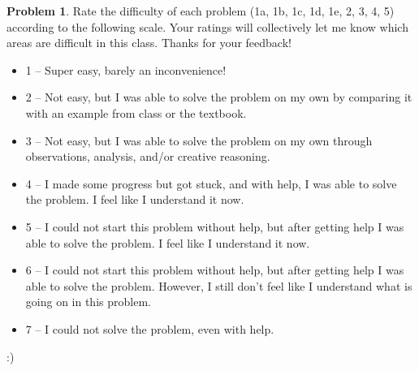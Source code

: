 \documentclass[11pt,oneside]{amsart}
\theoremstyle{definition}
\newtheorem{problem}{Problem}
\theoremstyle{plain}
\begin{document}
    \begin{problem}
        Rate the difficulty of each problem (1a, 1b, 1c, 1d, 1e, 2, 3, 4, 5) according to the following scale. Your ratings will collectively let me know which areas are difficult in this class. Thanks for your feedback!
        \begin{itemize}
            \item 1 -- Super easy, barely an inconvenience!
            \item 2 -- Not easy, but I was able to solve the problem on my own by comparing it with an example from class or the textbook.
            \item 3 -- Not easy, but I was able to solve the problem on my own through observations, analysis, and/or creative reasoning.
            \item 4 -- I made some progress but got stuck, and with help, I was able to solve the problem. I feel like I understand it now.
            \item 5 -- I could not start this problem without help, but after getting help I was able to solve the problem. I feel like I understand it now.
            \item 6 -- I could not start this problem without help, but after getting help I was able to solve the problem. However, I still don't feel like I understand what is going on in this problem.
            \item 7 -- I could not solve the problem, even with help.
        \end{itemize}
    \end{problem}
    \begin{solution}
        :)
    \end{solution}
\end{document}

